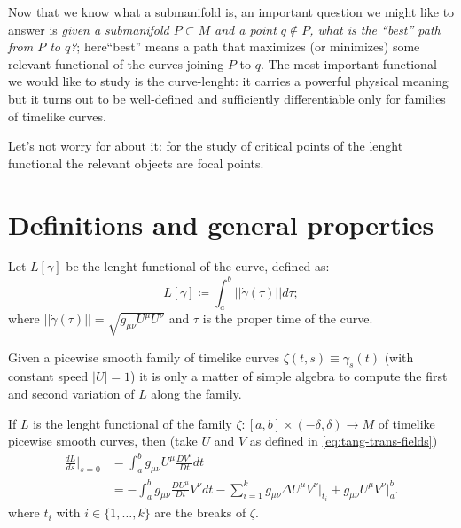 
Now that we know what a submanifold is, an important question we might like to answer is \emph{given a submanifold \(P\subset M\) and a point \(q \notin P\), what is the ``best'' path from \(P\) to \(q\)?}; here``best'' means a path that maximizes (or minimizes) some relevant functional of the curves joining \(P\) to \(q\). The most important functional we would like to study is the curve-lenght: it carries a powerful physical meaning but it turns out to be well-defined and sufficiently differentiable only for families of timelike curves. 

Let's not worry for about it: for the study of critical points of the lenght functional the relevant objects are focal points.

\section{Definitions and general properties}
Let \(L[\gamma]\) be the lenght functional of the curve, defined as:
\begin{equation*}
	L[\gamma] \coloneqq \int_{a}^{b} \vert\vert \dot{\gamma}(\tau) \vert\vert d\tau;
\end{equation*}
where \(\vert\vert \dot{\gamma}(\tau) \vert\vert = \sqrt{g_{\mu\nu}U^{\mu}U^{\nu}}\) and \(\tau\) is the proper time of the curve.

Given a picewise smooth family of timelike curves \(\zeta(t,s) \equiv \gamma_s(t)\) (with constant speed \(\vert U \vert = 1\)) it is only a matter of simple algebra to compute the first and second variation of \(L\) along the family.
\begin{lemma}
	\label{lemma:first-L-var}
	If \(L\) is the lenght functional of the family \(\zeta:[a,b] \times (-\delta, \delta) \rightarrow M\) of timelike picewise smooth curves, then (take \(U\) and \(V\) as defined in \ref{eq:tang-trans-fields})
	\begin{align*}
		\frac{dL}{ds}\Big\vert_{s = 0} &= \int_{a}^{b} g_{\mu\nu} U^{\mu}\frac{D V^{\nu}}{D t} dt  \\
		&=- \int_{a}^{b}  g_{\mu\nu} \frac{D U^{\mu}}{D t} V^{\nu} dt - \sum_{i = 1}^{k} g_{\mu\nu} \Delta U^{\mu}V^{\nu}\Big\vert_{t_i} + g_{\mu\nu} U^{\mu}V^{\nu}\Big\vert^b_a.
	\end{align*}
where \(t_i\) with \(i\in \{1, \ldots, k\}\) are the breaks of \(\zeta\).
\end{lemma}

